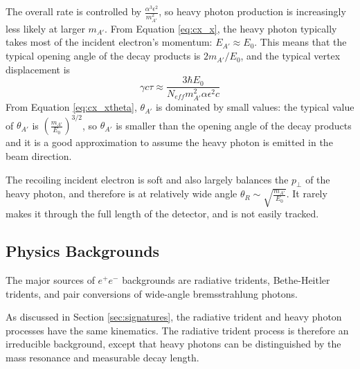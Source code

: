 The overall rate is controlled by $\frac{\alpha^3\epsilon^2}{m_{A'}^2}$, so heavy photon production is increasingly less likely at larger $m_{A'}$.
From Equation \ref{eq:cx_x}, the heavy photon typically takes most of the incident electron's momentum: $E_{A'}\approx E_0$.
This means that the typical opening angle of the decay products is $2m_{A'}/E_0$, and the typical vertex displacement is
\begin{equation}
    \gamma c\tau \approx \frac{3\hbar E_0}{N_{eff}m_{A'}^2\alpha\epsilon^2 c}
\end{equation}
From Equation \ref{eq:cx_xtheta}, $\theta_{A'}$ is dominated by small values: the typical value of $\theta_{A'}$ is $\left(\frac{m_{A'}}{E_0}\right)^{3/2}$, so $\theta_{A'}$ is smaller than the opening angle of the decay products and it is a good approximation to assume the heavy photon is emitted in the beam direction.

The recoiling incident electron is soft and also largely balances the $p_\perp$ of the heavy photon, and therefore is at relatively wide angle $\theta_R\sim \sqrt{\frac{m_{A'}}{E_0}}$.
It rarely makes it through the full length of the detector, and is not easily tracked.

\subsection{Physics Backgrounds}
\label{sec:physics_backgrounds}
The major sources of $e^+e^-$ backgrounds are radiative tridents, Bethe-Heitler tridents, and pair conversions of wide-angle bremsstrahlung photons.

As discussed in Section \ref{sec:signatures}, the radiative trident and heavy photon processes have the same kinematics.
The radiative trident process is therefore an irreducible background, except that heavy photons can be distinguished by the mass resonance and measurable decay length.

